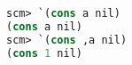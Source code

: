 \begin{lstlisting}[language=Scheme]
scm> `(cons a nil)
(cons a nil)
scm> `(cons ,a nil)
(cons 1 nil)
\end{lstlisting}
